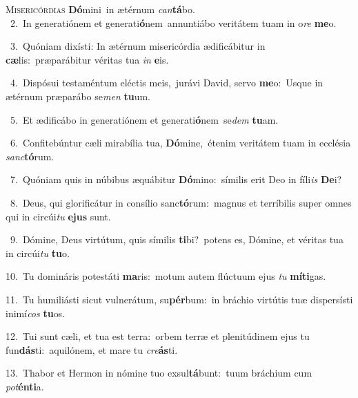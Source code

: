 \lettrine{\initial\textcolor{\initialcolor}{M}}{isericórdias} \textbf{Dó}\-mini~\star in ætérnum \textit{can}\-\textbf{tá}bo.\\
{\numbfont\textcolor{\numbcolor}{~2.}}~In generatiónem et generati\-\textbf{ó}\-nem~\star annuntiábo veritátem tuam in o\textit{re} \textbf{me}\-o.\par
{\numbfont\textcolor{\numbcolor}{~3.}}~Quóniam dixísti: In ætérnum misericórdia ædificábitur in \textbf{cæ}\-lis:~\star præparábitur véritas tua \textit{in} \textbf{e}\-is.\par
{\numbfont\textcolor{\numbcolor}{~4.}}~Dispósui testaméntum eléctis meis,~\dagger jurávi David, servo \textbf{me}\-o:~\star Usque in ætérnum præparábo se\textit{men} \textbf{tu}\-um.\par
{\numbfont\textcolor{\numbcolor}{~5.}}~Et ædificábo in generatiónem et generati\-\textbf{ó}\-nem~\star se\textit{dem} \textbf{tu}\-am.\par
{\numbfont\textcolor{\numbcolor}{~6.}}~Confitebúntur cæli mirabília tua, \textbf{Dó}\-mine,~\star étenim veritátem tuam in ecclésia \textit{sanc}\-\textbf{tó}rum.\par
{\numbfont\textcolor{\numbcolor}{~7.}}~Quóniam quis in núbibus æquábitur \textbf{Dó}\-mino:~\star símilis erit Deo in fíli\textit{is} \textbf{De}\-i?\par
{\numbfont\textcolor{\numbcolor}{~8.}}~Deus, qui glorificátur in consílio sanc\-\textbf{tó}\-rum:~\star magnus et terríbilis super omnes qui in circúi\textit{tu} \textbf{e}\-\textbf{jus} sunt.\par
{\numbfont\textcolor{\numbcolor}{~9.}}~Dómine, Deus virtútum, quis símilis \textbf{ti}\-bi?~\star potens es, Dómine, et véritas tua in circúi\textit{tu} \textbf{tu}\-o.\par
{\numbfont\textcolor{\numbcolor}{10.}}~Tu domináris potestáti \textbf{ma}\-ris:~\star motum autem flúctuum ejus \textit{tu} \textbf{mí}\-\textbf{ti}gas.\par
{\numbfont\textcolor{\numbcolor}{11.}}~Tu humiliásti sicut vulnerátum, su\-\textbf{pér}\-bum:~\star in bráchio virtútis tuæ dispersísti inimí\textit{cos} \textbf{tu}\-os.\par
{\numbfont\textcolor{\numbcolor}{12.}}~Tui sunt cæli, et tua est terra:~\dagger orbem terræ et plenitúdinem ejus tu fun\-\textbf{dás}\-ti:~\star aquilónem, et mare tu \textit{cre}\-\textbf{ás}ti.\par
{\numbfont\textcolor{\numbcolor}{13.}}~Thabor et Hermon in nómine tuo exsul\-\textbf{tá}\-bunt:~\star tuum bráchium cum \textit{pot}\-\textbf{én}\textbf{ti}a.\par
